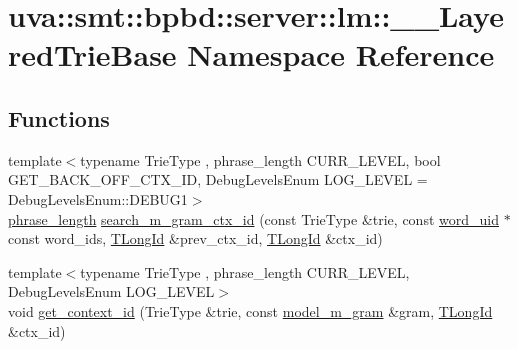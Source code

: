 \hypertarget{namespaceuva_1_1smt_1_1bpbd_1_1server_1_1lm_1_1_____layered_trie_base}{}\section{uva\+:\+:smt\+:\+:bpbd\+:\+:server\+:\+:lm\+:\+:\+\_\+\+\_\+\+Layered\+Trie\+Base Namespace Reference}
\label{namespaceuva_1_1smt_1_1bpbd_1_1server_1_1lm_1_1_____layered_trie_base}
\subsection*{Functions}
\begin{DoxyCompactItemize}
\item 
{\footnotesize template$<$typename Trie\+Type , phrase\+\_\+length C\+U\+R\+R\+\_\+\+L\+E\+V\+E\+L, bool G\+E\+T\+\_\+\+B\+A\+C\+K\+\_\+\+O\+F\+F\+\_\+\+C\+T\+X\+\_\+\+I\+D, Debug\+Levels\+Enum L\+O\+G\+\_\+\+L\+E\+V\+E\+L = Debug\+Levels\+Enum\+::\+D\+E\+B\+U\+G1$>$ }\\\hyperlink{namespaceuva_1_1smt_1_1bpbd_1_1server_af068a19c2e03116caf3e3827a3e40e35}{phrase\+\_\+length} \hyperlink{namespaceuva_1_1smt_1_1bpbd_1_1server_1_1lm_1_1_____layered_trie_base_aaee3fee0143880fcd495224ba8957c09}{search\+\_\+m\+\_\+gram\+\_\+ctx\+\_\+id} (const Trie\+Type \&trie, const \hyperlink{namespaceuva_1_1smt_1_1bpbd_1_1server_a6bfe45ba344d65a7fdd7d26156328ddc}{word\+\_\+uid} $\ast$const word\+\_\+ids, \hyperlink{namespaceuva_1_1smt_1_1bpbd_1_1server_1_1lm_1_1identifiers_a6841847096e455ad3c38689bc548b3b0}{T\+Long\+Id} \&prev\+\_\+ctx\+\_\+id, \hyperlink{namespaceuva_1_1smt_1_1bpbd_1_1server_1_1lm_1_1identifiers_a6841847096e455ad3c38689bc548b3b0}{T\+Long\+Id} \&ctx\+\_\+id)
\item 
{\footnotesize template$<$typename Trie\+Type , phrase\+\_\+length C\+U\+R\+R\+\_\+\+L\+E\+V\+E\+L, Debug\+Levels\+Enum L\+O\+G\+\_\+\+L\+E\+V\+E\+L$>$ }\\void \hyperlink{namespaceuva_1_1smt_1_1bpbd_1_1server_1_1lm_1_1_____layered_trie_base_a0619b1b508acf2188d98b3d2f32142bc}{get\+\_\+context\+\_\+id} (Trie\+Type \&trie, const \hyperlink{classuva_1_1smt_1_1bpbd_1_1server_1_1lm_1_1m__grams_1_1model__m__gram}{model\+\_\+m\+\_\+gram} \&gram, \hyperlink{namespaceuva_1_1smt_1_1bpbd_1_1server_1_1lm_1_1identifiers_a6841847096e455ad3c38689bc548b3b0}{T\+Long\+Id} \&ctx\+\_\+id)
\end{DoxyCompactItemize}


